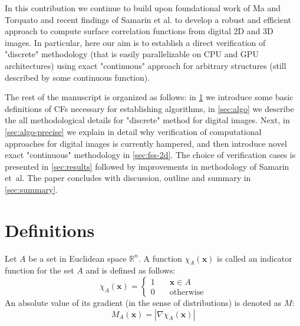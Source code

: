 \documentclass[preprint]{elsarticle}
\begin{document}
In this contribution we continue to build upon foundational work of Ma and
Torquato \cite{ma2018SS} and recent findings of Samarin et al. \cite{Samarin} to
develop a robust and efficient approach to compute surface correlation functions
from digital 2D and 3D images. In particular, here our aim is to establish a
direct verification of "discrete" methodology (that is easily parallelizable on
CPU and GPU architectures) using exact "continuous" approach for arbitrary
structures (still described by some continuous function).

The rest of the manuscript is organized as follows: in \cref{sec:def} we
introduce some basic definitions of CFs necessary for establishing algorithms,
in \cref{sec:algo} we describe the all methodological details for "discrete"
method for digital images. Next, in \cref{sec:algo-precise} we explain in detail
why verification of computational approaches for digital images is currently
hampered, and then introduce novel exact "continuous" methodology in
\cref{sec:fss-2d}. The choice of verification cases is presented in
\cref{sec:results} followed by improvements in methodology of Samarin et~al. The
paper concludes with discussion, outline and summary in \cref{sec:summary}.

\section{Definitions}
\label{sec:def}
Let $A$ be a set in Euclidean space $\mathbb{R}^n$. A function
$\chi_A(\mathbf{x})$ is called an indicator function for the set $A$ and is
defined as follows:
\begin{equation}
  \chi_A(\bm{x}) = \left\{
  \begin{array}{ll}
    1 & \quad \bm{x} \in A \\
    0 & \quad \text{otherwise}
  \end{array}
  \right.
\end{equation}
An absolute value of its gradient (in the sense of distributions) is denoted
as $M$:
\begin{equation}
  M_A(\bm{x}) = |\nabla \chi_A(\bm{x})|
\end{equation}
\end{document}
